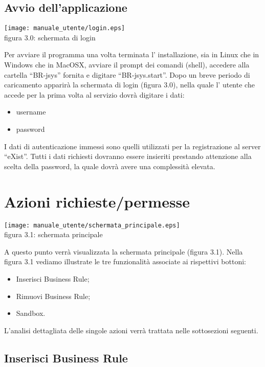 \subsection{Avvio dell'applicazione}

\begin{center}
\texttt{[image: manuale\_utente/login.eps]}\\
 figura 3.0: schermata di login
\end{center}

Per avviare il programma una volta terminata l' installazione, sia in Linux che in Windows che in MacOSX, avviare il prompt dei comandi (shell), accedere alla cartella ``BR-jsys'' fornita e digitare ``BR-jsys.start''. Dopo un breve periodo di caricamento apparir\`a la schermata di login (figura 3.0), nella quale l' utente che accede per la prima volta al servizio dovr\`a digitare i dati: 
\begin{itemize}
\item username
\item password
\end{itemize}
I dati di autenticazione immessi sono quelli utilizzati per la registrazione al server ``eXist''. Tutti i dati richiesti dovranno essere insieriti prestando attenzione alla scelta della password, la quale dovr\`a avere una complessit\`a elevata. 
\section{Azioni richieste/permesse}

\begin{center}
\texttt{[image: manuale\_utente/schermata\_principale.eps]}\\
 figura 3.1: schermata principale
\end{center}

A questo punto verr\`a visualizzata la schermata principale (figura 3.1).
Nella figura 3.1 vediamo illustrate le tre funzionalit\`a associate ai rispettivi bottoni:
\begin{itemize}
\item Inserisci Business Rule;
\item Rimuovi Business Rule;
\item Sandbox.
\end{itemize}
L'analisi dettagliata delle singole azioni verr\`a trattata nelle sottosezioni seguenti.
\subsection{Inserisci Business Rule}

